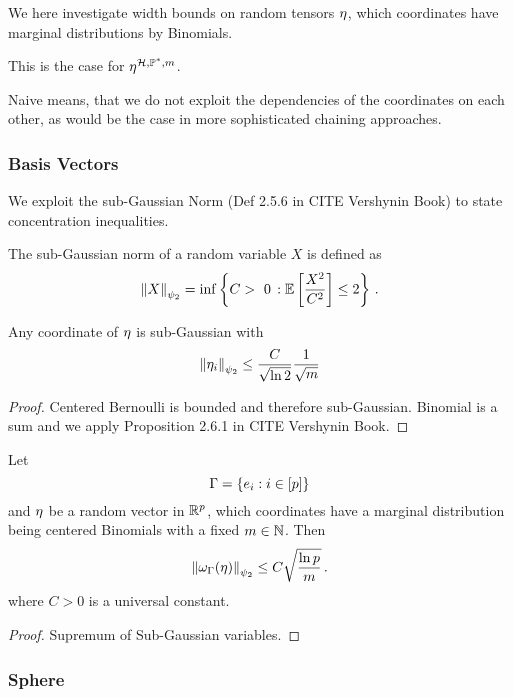 We here investigate width bounds on random tensors $\eta$, which coordinates have marginal distributions by Binomials.

This is the case for $\eta^{\mathcal{H},\mathbb{P}^*,m}$.

Naive means, that we do not exploit the dependencies of the coordinates on each other, as would be the case in more sophisticated chaining approaches.

\subsubsection{Basis Vectors}

We exploit the sub-Gaussian Norm (Def 2.5.6 in CITE Vershynin Book) to state concentration inequalities.

\begin{definition}
	The sub-Gaussian norm of a random variable $X$ is defined as
		\[ \sgnormof{X} = \inf \left\{ C > 0 \, : \expectationof{\frac{X^2}{C^2} } \leq 2 \right\} \, .  \]
\end{definition}

\begin{theorem}
	Any coordinate of $\eta$ is sub-Gaussian with 
		\[ \left\|\eta_i\right\|_{\psi_2} \leq \frac{C}{\sqrt{\ln2}} \frac{1}{\sqrt{m}} \]
\end{theorem}
\begin{proof}
	Centered Bernoulli is bounded and therefore sub-Gaussian.
	Binomial is a sum and we apply Proposition 2.6.1 in CITE Vershynin Book.
\end{proof}


\begin{theorem}\label{the:basisTensorWidthBound}
	Let 
		\[ \Gamma = \{e_{i} : i \in [p] \}\]
	and $\eta$ be a random vector in $\mathbb{R}^p$, which coordinates have a marginal distribution being centered Binomials with a fixed $m\in\mathbb{N}$.
	Then
		\[ \left\|\omega_{\Gamma}(\eta)\right\|_{\psi_2} \leq C \sqrt{\frac{\ln p}{m}} \, . \]
	where $C>0$ is a universal constant.
\end{theorem}
\begin{proof}
	Supremum of Sub-Gaussian variables.
\end{proof}


\subsubsection{Sphere}

